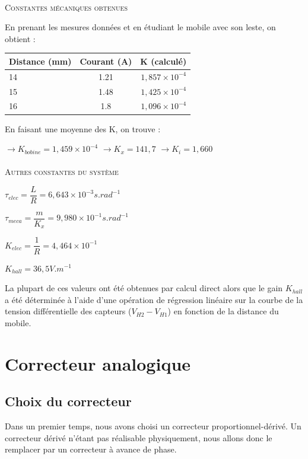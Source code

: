 \documentclass[11pt, french]{article} %
\begin{document}
\paragraph{}
\textsc{Constantes mécaniques obtenues}

\noindent
En prenant les mesures données et en étudiant le mobile avec son leste, on obtient  :

\medskip
\begin{tabular} {|l|c|r|}
	 \hline
	\textbf{Distance (mm)} & \textbf{Courant (A)} & \textbf{K (calculé)} \\ \hline
	14 & 1.21 & $ 1,857 \times 10^{-4} $ \\ \hline
	15 & 1.48 & $ 1,425  \times 10^{-4} $ \\ \hline
	16 & 1.8 & $ 1,096  \times 10^{-4} $ \\ \hline
\end{tabular}

\medskip
\noindent
En faisant une moyenne des K, on trouve :

\medskip
$ \rightarrow K_{bobine} = 1,459 \times 10^{-4} $
$ \rightarrow K_x = 141,7 $
$ \rightarrow K_i = 1,660 $

\paragraph{}
\textsc{Autres constantes du système}

\medskip
$  \tau_{elec} = \dfrac L R = 6,643 \times 10^{-3} s.rad^{-1} $

$  \tau_{meca} = \dfrac m {K_x} = 9,980 \times 10^{-1} s.rad^{-1} $

\medskip
$  K_{elec} = \dfrac 1 R = 4,464 \times 10^{-1} $

$  K_{hall} = 36,5 V.m^{-1} $

\medskip
La plupart de ces valeurs ont été obtenues par calcul direct alors que le gain $ K_{hall} $ a été déterminée à l'aide d'une opération de régression linéaire sur la courbe de la tension différentielle des capteurs ($ V_{H2} - V_{H1} $) en fonction de la distance du mobile.

\section{Correcteur analogique}
\subsection{Choix du correcteur}
Dans un premier temps, nous avons choisi un correcteur proportionnel-dérivé. Un correcteur dérivé n'étant pas réalisable physiquement, nous allons donc le remplacer par un correcteur à avance de phase.
\end{document}
